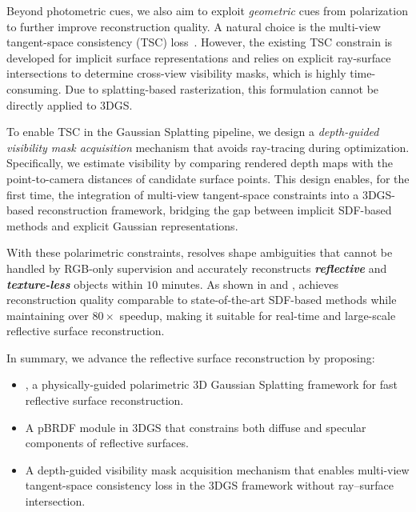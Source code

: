 Beyond photometric cues, we also aim to exploit \emph{geometric} cues from polarization to further improve reconstruction quality. 
A natural choice is the multi-view tangent-space consistency (TSC) loss~\citep{cao2023multi,han2024nersp}. However, the existing TSC constrain is developed for implicit surface representations and relies on explicit ray-surface intersections to determine cross-view visibility masks, which is highly time-consuming. 
Due to splatting-based rasterization, this formulation cannot be directly applied to 3DGS.

To enable TSC in the Gaussian Splatting pipeline, we design a \emph{depth-guided visibility mask acquisition} mechanism that avoids ray-tracing during optimization. 
Specifically, we estimate visibility by comparing rendered depth maps with the point-to-camera distances of candidate surface points. 
This design enables, for the first time, the integration of multi-view tangent-space constraints into a 3DGS-based reconstruction framework, bridging the gap between implicit SDF-based methods and explicit Gaussian representations.

With these polarimetric constraints, \polgs resolves shape ambiguities that cannot be handled by RGB-only supervision and accurately reconstructs \textbf{\emph{reflective}} and \textbf{\emph{texture-less}} objects within $10$ minutes. 
As shown in  and , \polgs achieves reconstruction quality comparable to state-of-the-art SDF-based methods while maintaining over $80\times$ speedup, making it suitable for real-time and large-scale reflective surface reconstruction.




In summary, we advance the reflective surface reconstruction by proposing:
\begin{itemize}
\item \polgs, a physically-guided polarimetric 3D Gaussian Splatting framework for fast reflective surface reconstruction.

\item A pBRDF module in 3DGS that constrains both diffuse and specular components of reflective surfaces.

\item A depth-guided visibility mask acquisition mechanism that enables multi-view tangent-space consistency loss in the 3DGS framework without ray--surface intersection.
\end{itemize}


